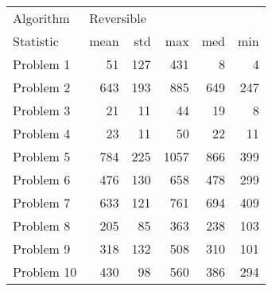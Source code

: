 \begin{tabular}{lrrrrr}
\toprule
Algorithm & \multicolumn{5}{l}{Reversible} \\
Statistic &       mean &  std &   max &  med &  min \\
\midrule
Problem 1  &         51 &  127 &   431 &    8 &    4 \\
Problem 2  &        643 &  193 &   885 &  649 &  247 \\
Problem 3  &         21 &   11 &    44 &   19 &    8 \\
Problem 4  &         23 &   11 &    50 &   22 &   11 \\
Problem 5  &        784 &  225 &  1057 &  866 &  399 \\
Problem 6  &        476 &  130 &   658 &  478 &  299 \\
Problem 7  &        633 &  121 &   761 &  694 &  409 \\
Problem 8  &        205 &   85 &   363 &  238 &  103 \\
Problem 9  &        318 &  132 &   508 &  310 &  101 \\
Problem 10 &        430 &   98 &   560 &  386 &  294 \\
\bottomrule
\end{tabular}
